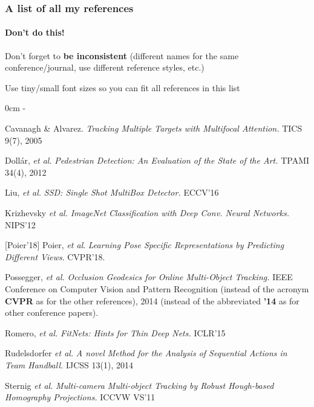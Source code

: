 \begin{frame}
  \frametitle{A list of all my references}
  \framesubtitle{\textcolor{clrsred}{\textbf{Don't do this!}}}
  \begin{lrsitemize}
    \setlength{\itemsep}{3pt}
    \item Don't forget to \textcolor{clrsred}{\textbf{be inconsistent}} (different names for the same conference/journal, use different reference styles, etc.)
    \item Use tiny/small font sizes so you can fit all references in this list
  \end{lrsitemize}
  \begin{lrsitemize}
    \newlength\listindent
    \setlength\listindent{12pt}
     0cm \linewidth \listindent \dimexpr\linewidth-\listindent\relax
    \scriptsize
    \setlength{\itemsep}{3pt}
    \item[] [1] Cavanagh \& Alvarez. \emph{Tracking Multiple Targets with Multifocal Attention.} TICS 9(7), 2005
    \item[] [2] Doll\'ar, \emph{et al.} \emph{Pedestrian Detection: An Evaluation of the State of the Art.} TPAMI 34(4), 2012
    \item[] [3] Liu, \emph{et al.} \emph{SSD: Single Shot MultiBox Detector.} ECCV'16
    \item[] [4] Krizhevsky \emph{et al.} \emph{ImageNet Classification with Deep Conv. Neural Networks.} NIPS'12
    \item[] \textcolor{clrsred}{[Poier'18]} Poier, \emph{et al}. \emph{Learning Pose Specific Representations by Predicting Different Views}. CVPR'18.
    \item[] [5] Possegger, \emph{et al.} \emph{Occlusion Geodesics for Online Multi-Object Tracking.} IEEE Conference on Computer Vision and Pattern Recognition (\textcolor{clrsred}{instead of the acronym \textbf{CVPR} as for the other references}), 2014 (\textcolor{clrsred}{instead of the abbreviated \textbf{'14} as for other conference papers}).
    \item[] [6] Romero, \emph{et al.} \emph{FitNets: Hints for Thin Deep Nets.} ICLR'15
    \item[] [7] Rudelsdorfer \emph{et al.} \emph{A novel Method for the Analysis of Sequential Actions in Team Handball.} IJCSS 13(1), 2014
    \item[] [8] Sternig \emph{et al.} \emph{Multi-camera Multi-object Tracking by Robust Hough-based Homography Projections.} ICCVW VS'11
  \end{lrsitemize}
\end{frame}
